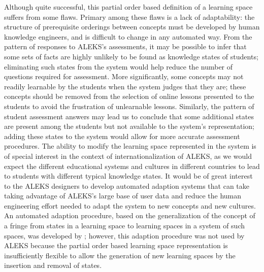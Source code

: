 \documentclass[11pt]{llncs}
\begin{document}
{Although quite successful, this partial order based definition of a learning space suffers from some flaws. Primary among these flaws is a lack of adaptability: the structure of prerequisite orderings between concepts must be developed by human knowledge engineers, and is difficult to change in any automated way. From the pattern of responses to ALEKS's assessments, it may be possible to infer that some sets of facts are highly unlikely to be found as knowledge states of students; eliminating such states from the system would help reduce the number of questions required for assessment. More significantly, some concepts may not readily learnable by the students when the system judges that they are; these concepts should be removed from the selection of online lessons presented to the students to avoid the frustration of unlearnable lessons. Similarly, the pattern of student assessment answers may lead us to conclude that some additional states are present among the students but not available to the system's representation; adding these states to the system would allow for more accurate assessment procedures. The ability to modify the learning space represented in the system is of special interest in the context of internationalization of ALEKS, as we would expect the different educational systems and cultures in different countries to lead to students with different typical knowledge states. It would be of great interest to the ALEKS designers to develop automated adaption systems that can take taking advantage of ALEKS's large base of user data and reduce the human engineering effort needed to adapt the system to new concepts and new cultures. An automated adaption procedure, based on the generalization of the concept of a fringe from states in a learning space to learning spaces in a system of such spaces, was developed by \citet{Thi-01}; however, this adaption procedure was not used by ALEKS because the  partial order based learning space representation is insufficiently flexible to allow the generation of new learning spaces by the insertion and removal of states.

}
\end{document}
